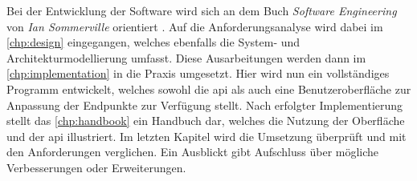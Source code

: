 Bei der Entwicklung der Software wird sich an dem Buch \textit{Software Engineering} von \textit{Ian Sommerville} orientiert \cite{Sommerville.2016}. Auf die Anforderungsanalyse wird dabei im \autoref{chp:design} eingegangen, welches ebenfalls die System- und Architekturmodellierung umfasst. Diese Ausarbeitungen werden dann im \autoref{chp:implementation} in die Praxis umgesetzt. Hier wird nun ein vollständiges Programm entwickelt, welches sowohl die \gls{api} als auch eine Benutzeroberfläche zur Anpassung der Endpunkte zur Verfügung stellt. Nach erfolgter Implementierung stellt das \autoref{chp:handbook} ein Handbuch dar, welches die Nutzung der Oberfläche und der \gls{api} illustriert. Im letzten Kapitel wird die Umsetzung überprüft und mit den Anforderungen verglichen. Ein Ausblickt gibt Aufschluss über mögliche Verbesserungen oder Erweiterungen. 